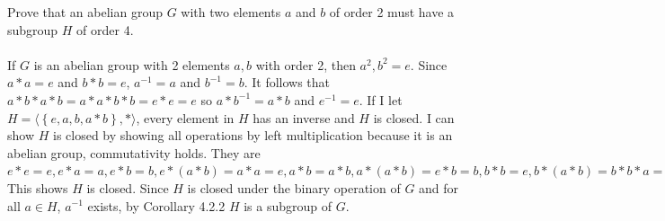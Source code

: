 \documentclass[titlepage]{article}
\newenvironment{problem}[2][Problem]{\begin{trivlist}
\item[\hskip \labelsep {\bfseries #1}\hskip \labelsep {\bfseries #2.}]}{\end{trivlist}}
\begin{document}
\begin{problem}{4}
Prove that an abelian group $G$ with two elements $a$ and $b$ of order 2 must have a subgroup $H$ of order 4.
\\ \\
If $G$ is an abelian group with 2 elements $a,b$ with order 2, then $a^2,b^2=e$. Since $a*a = e$ and $b*b=e$, $a^{-1}=a$ and $b^{-1}=b$. It follows that $a*b*a*b = a*a*b*b = e*e = e$ so $a*b^{-1} = a*b$ and $e^{-1} = e$. If I let $H = \langle \left\{e,a,b,a*b \right\}, * \rangle$, every element in $H$ has an inverse and $H$ is closed. I can show $H$ is closed by showing all operations by left multiplication because it is an abelian group, commutativity holds. They are $e*e = e, e*a = a, e*b=b, e*(a*b)=a*a=e, a*b=a*b, a*(a*b) = e*b=b, b*b=e, b*(a*b) = b*b*a = a.$ This shows $H$ is closed. Since $H$ is closed under the binary operation of $G$ and for all $a \in H$, $a^{-1}$ exists, by Corollary 4.2.2 $H$ is a subgroup of $G$.
\end{problem}
\end{document}
